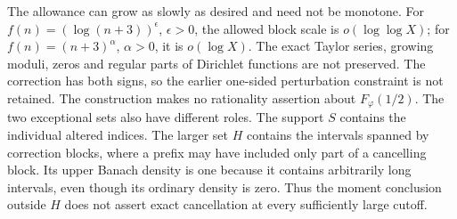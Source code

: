 \documentclass[11pt]{article}
\theoremstyle{plain}
\theoremstyle{definition}
\theoremstyle{remark}
\begin{document}
The allowance can grow as slowly as desired and need not be monotone.
For $f(n)=(\log(n+3))^\epsilon$, $\epsilon>0$, the allowed block scale
is $o(\log\log X)$; for $f(n)=(n+3)^\alpha$, $\alpha>0$, it is
$o(\log X)$. The exact Taylor series, growing moduli, zeros and regular
parts of Dirichlet functions are not preserved. The correction has both signs, so the earlier one-sided perturbation
constraint is not retained. The construction makes no rationality
assertion about $F_\varphi(1/2)$.
The two exceptional sets also have different roles. The support $S$
contains the individual altered indices. The larger set $H$ contains
the intervals spanned by correction blocks, where a prefix may have
included only part of a cancelling block. Its upper Banach density is
one because it contains arbitrarily long intervals, even though its
ordinary density is zero. Thus the moment conclusion outside $H$
does not assert exact cancellation at every sufficiently large cutoff.
\end{document}
